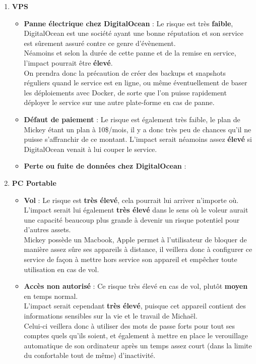 \documentclass[a4paper,10pt,final,fleqn]{article}
\begin{document}
			\begin{enumerate}
				\item \textbf{VPS}

					\begin{itemize}
						\item \textbf{Panne électrique chez DigitalOcean} : Le risque est très \textbf{faible}, DigitalOcean est une société ayant une bonne réputation et son service est sûrement assuré contre ce genre d'évènement.\\
						Néamoins et selon la durée de cette panne et de la remise en service, l'impact pourrait être \textbf{élevé}.\\
						On prendra donc la précaution de créer des backups et snapshots réguliers quand le service est en ligne, ou même éventuellement de baser les déploiements avec Docker, de sorte que l'on puisse rapidement déployer le service sur une autre plate-forme en cas de panne.
						\item \textbf{Défaut de paiement} : Le risque est également très faible, le plan de Mickey étant un plan à 10\$/mois, il y a donc très peu de chances qu'il ne puisse s'affranchir de ce montant. L'impact serait néamoins assez \textbf{élevé} si DigitalOcean venait à lui couper le service.
						\item \textbf{Perte ou fuite de données chez DigitalOcean} :  
					\end{itemize}

				\item \textbf{PC Portable}

					\begin{itemize}
						\item \textbf{Vol} : Le risque est \textbf{très élevé}, cela pourrait lui arriver n'importe où. L'impact serait lui également \textbf{très élevé} dans le sens où le voleur aurait une capacité beaucoup plus grande à devenir un risque potentiel pour d'autres assets.\\
						Mickey possède un Macbook, Apple permet à l'utilisateur de bloquer de manière assez sûre ses appareils à distance, il veillera donc à configurer ce service de façon à mettre hors service son appareil et empêcher toute utilisation en cas de vol.\\

						\item \textbf{Accès non autorisé} : Ce risque très élevé en cas de vol, plutôt \textbf{moyen} en temps normal.\\
						L'impact serait cependant \textbf{très élevé}, puisque cet appareil contient des informations sensibles sur la vie et le travail de Michaël.\\
						Celui-ci veillera donc à utiliser des mots de passe forts pour tout ses comptes quels qu'ils soient, et également à mettre en place le verouillage automatique de son ordinateur après un temps assez court (dans la limite du confortable tout de même) d'inactivité.\\


\end{itemize}
\end{enumerate}
\end{document}
